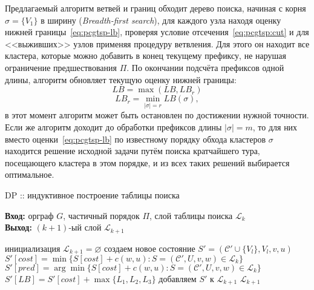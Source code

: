 Предлагаемый алгоритм ветвей и границ обходит дерево поиска,
начиная с корня
$\sigma=\{V_1\}$
в ширину
({\it Breadth-first search}),
для каждого узла
находя оценку нижней границы~\eqref{eq:pcgtsp-lb},
проверяя условие отсечения~\eqref{eq:pcgtsp:cut}
и для <<выживших>> узлов применяя процедуру ветвления.
Для этого он находит все кластера,
которые можно добавить в конец текущему префиксу,
не нарушая ограничение предшествования $\Pi$.
По окончании подсчёта префиксов одной длины,
алгоритм обновляет текущую оценку нижней границы:
$$
LB = \max(LB, LB_r)
$$
$$
LB_r = \min_{|\sigma|=r} LB(\sigma),
$$
в этот момент алгоритм может быть остановлен
по достижении нужной точности.
Если же алгоритм доходит до обработки
префиксов длины
$|\sigma|=m$,
то для них вместо оценки~\eqref{eq:pcgtsp-lb}
по известному порядку обхода кластеров $\sigma$
находится решение исходной задачи путём поиска кратчайшего тура,
посещающего кластера в этом порядке,
и из всех таких решений выбирается оптимальное.

\begin{algorithm}[t]
    \caption{DP ::  индуктивное построение таблицы поиска}\label{alg:A2}
    \textbf{Вход:} орграф $G$, частичный порядок $\Pi$, слой таблицы поиска $\mathcal L_k$\\
    \textbf{Выход:} $(k+1)$-ый слой $\mathcal L_{k+1}$
    \begin{algorithmic}[1]
    \STATE инициализация $\mathcal L_{k+1}=\varnothing$
          \STATE создаем новое состояние $S'=(\mathcal C'\cup\{V_l\}, V_l, v, u)$
          \STATE $S'[cost] = \min\{S[cost] + c(w,u)\colon S=(\mathcal C',U,v,w)\in\mathcal L_k\}$
          \STATE $S'[pred] = \arg\min\{S[cost] + c(w,u)\colon S=(\mathcal C',U,v,w)\in\mathcal L_k\}$
          \STATE $S'[LB] = S'[cost] + \max\{L_1,L_2,L_3\}$
            \label{alg:A2:LB}
              \label{alg:A2:cut}
            \STATE добавляем $S'$ к $\mathcal L_{k+1}$
          \ENDIF
        \ENDIF
        \ENDFOR
      \ENDFOR
    \ENDFOR
    \RETURN $\mathcal L_{k+1}$
    \end{algorithmic}
\end{algorithm}

